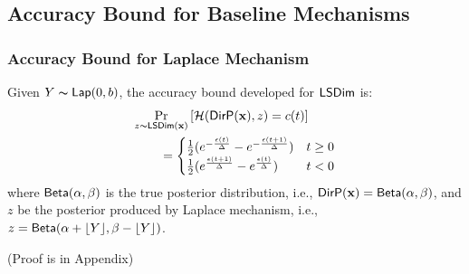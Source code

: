 \documentclass{article}
\begin{document}
\subsection{Accuracy Bound for Baseline Mechanisms}



\subsubsection{Accuracy Bound for Laplace Mechanism}
\label{subsec_accuracy_lap}
\begin{lem}
\label{lem_acc_lap}
Given $Y \thicksim \mathsf{Lap}(0, b)$, the accuracy bound developed for $\mathsf{LSDim}$ is:
\begin{align*}
&
\underset{z \thicksim \mathsf{LSDim}(\textbf{x})}{\Pr}\left[ 
\mathcal{H}(\mathsf{DirP}(\textbf{x}), z ) = c(t)
 \right]
\\
&\qquad = 
\begin{cases}
\frac{1}{2} (e^{- \frac{\epsilon (t)}{\Delta }} - e^{- \frac{\epsilon (t + 1)}{\Delta }}) &  t \geq 0\\
\frac{1}{2} (e^{\frac{\epsilon (t + 1)}{\Delta }} - e^{\frac{\epsilon (t)}{\Delta }}) & t < 0
\end{cases}
\end{align*}
where $\mathsf{Beta}(\alpha, \beta)$ is the true posterior distribution, i.e., $\mathsf{DirP}(\textbf{x}) = \mathsf{Beta}(\alpha, \beta)$, and $z$ be the posterior produced by Laplace mechanism, i.e., $z = \mathsf{Beta}(\alpha + \lfloor Y \rfloor, \beta - \lfloor Y \rfloor)$.
\end{lem}
(Proof is in Appendix)
\end{document}

